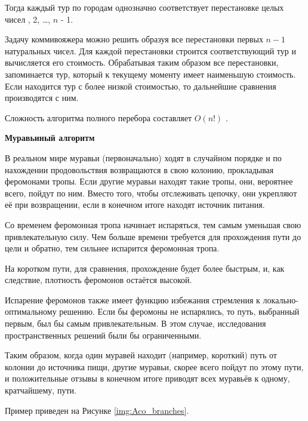 Тогда каждый тур по городам однозначно соответствует перестановке целых чисел , 2, \dots, $n$ - 1.

Задачу коммивояжера можно решить образуя все перестановки первых $n-1$ натуральных чисел. Для каждой перестановки строится соответствующий тур и вычисляется его стоимость. Обрабатывая таким образом все перестановки, запоминается тур, который к текущему моменту имеет наименьшую стоимость. Если находится тур с более низкой стоимостью, то дальнейшие сравнения производятся с ним.

Сложность алгоритма полного перебора составляет $O(n!)$ \cite{analyse}.

\textbf{Муравьиный алгоритм}

В реальном мире муравьи (первоначально) ходят в случайном порядке и по нахождении продовольствия возвращаются в свою колонию, прокладывая феромонами тропы. Если другие муравьи находят такие тропы, они, вероятнее всего, пойдут по ним. Вместо того, чтобы отслеживать цепочку, они укрепляют её при возвращении, если в конечном итоге находят источник питания. 

Со временем феромонная тропа начинает испаряться, тем самым уменьшая свою привлекательную силу. Чем больше времени требуется для прохождения пути до цели и обратно, тем сильнее испарится феромонная тропа. 

На коротком пути, для сравнения, прохождение будет более быстрым, и, как следствие, плотность феромонов остаётся высокой. 

Испарение феромонов также имеет функцию избежания стремления к локально-оптимальному решению. Если бы феромоны не испарялись, то путь, выбранный первым, был бы самым привлекательным. В этом случае, исследования пространственных решений были бы ограниченными. 

Таким образом, когда один муравей находит (например, короткий) путь от колонии до источника пищи, другие муравьи, скорее всего пойдут по этому пути, и положительные отзывы в конечном итоге приводят всех муравьёв к одному, кратчайшему, пути.

Пример приведен на Рисунке \ref{img:Aco_branches}.


